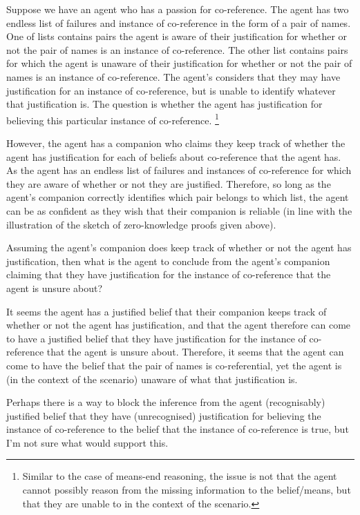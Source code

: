 \documentclass[10pt]{article}
\begin{document}
Suppose we have an agent who has a passion for co-reference.
The agent has two endless list of failures and instance of co-reference in the form of a pair of names.
One of lists contains pairs the agent is aware of their justification for whether or not the pair of names is an instance of co-reference.
The other list contains pairs for which the agent is unaware of their justification for whether or not the pair of names is an instance of co-reference.
The agent's considers that they may have justification for an instance of co-reference, but is unable to identify whatever that justification is.
The question is whether the agent has justification for believing this particular instance of co-reference.\nolinebreak
\footnote{Similar to the case of means-end reasoning, the issue is not that the agent cannot possibly reason from the missing information to the belief/means, but that they are unable to in the context of the scenario.}

However, the agent has a companion who claims they keep track of whether the agent has justification for each of beliefs about co-reference that the agent has.
As the agent has an endless list of failures and instances of co-reference for which they are aware of whether or not they are justified.
Therefore, so long as the agent's companion correctly identifies which pair belongs to which list, the agent can be as confident as they wish that their companion is reliable (in line with the illustration of the sketch of zero-knowledge proofs given above).

Assuming the agent's companion does keep track of whether or not the agent has justification, then what is the agent to conclude from the agent's companion claiming that they have justification for the instance of co-reference that the agent is unsure about?

It seems the agent has a justified belief that their companion keeps track of whether or not the agent has justification, and that the agent therefore can come to have a justified belief that they have justification for the instance of co-reference that the agent is unsure about.
Therefore, it seems that the agent can come to have the belief that the pair of names is co-referential, yet the agent is (in the context of the scenario) unaware of what that justification is.

Perhaps there is a way to block the inference from the agent (recognisably) justified belief that they have (unrecognised) justification for believing the instance of co-reference to the belief that the instance of co-reference is true, but I'm not sure what would support this.
\end{document}
